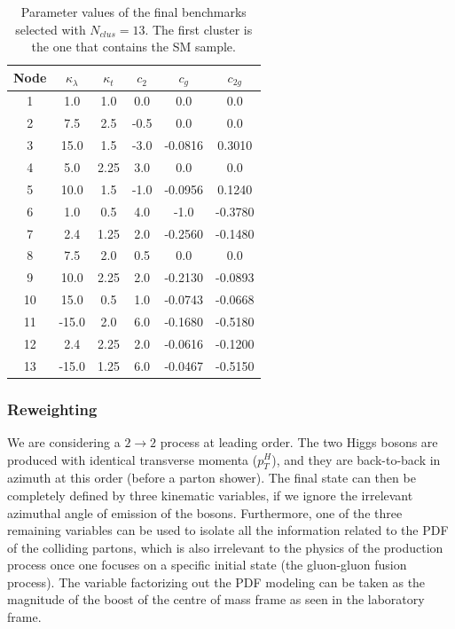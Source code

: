 \begin{table}
\centering
\small{
\begin{tabular}{|c||c|c|c|c|c|}
\hline
Node & $\kappa_{\lambda}$ & $\kappa_{t}$ & $c_2$ & $c_g$ & $c_{2g}$ \\\hline
1  &   1.0 & 1.0  &  0.0 &  0.0 &  0.0  \\ \hline
2  &   7.5 & 2.5  & -0.5 &  0.0    &  0.0      \\ \hline
3  &  15.0 & 1.5  & -3.0 & -0.0816 &  0.3010   \\\hline
4  &   5.0 & 2.25 &  3.0 &  0.0    &  0.0     \\\hline
5  &  10.0 & 1.5  & -1.0 & -0.0956 &  0.1240  \\ \hline
6  &   1.0 & 0.5  &  4.0 & -1.0    & -0.3780  \\ \hline
7  &   2.4 & 1.25 &  2.0 & -0.2560 & -0.1480  \\ \hline
8  &   7.5 & 2.0  &  0.5 &  0.0    &  0.0     \\ \hline
9  &  10.0 & 2.25 &  2.0 & -0.2130 & -0.0893  \\ \hline
10 &  15.0 & 0.5  &  1.0 & -0.0743 & -0.0668  \\ \hline
11 & -15.0 & 2.0  &  6.0 & -0.1680 & -0.5180  \\ \hline
12 &   2.4 & 2.25 &  2.0 & -0.0616 & -0.1200   \\ \hline
13 & -15.0 & 1.25 &  6.0 & -0.0467 & -0.5150   \\ \hline
\end{tabular}
}
\caption{\small Parameter values of the final benchmarks selected with $N_{clus} = 13$. 
The first cluster is the one that contains the SM sample. 
\label{tab:bench_old}}
\end{table} 

\subsubsection{Reweighting}
\label{sec:rewei}

We are considering a $2\to 2$ process at leading order. The two Higgs bosons are produced with identical transverse momenta ($p_{T}^{H}$), and they are back-to-back in azimuth at this order (before a parton shower). The final state can then be completely defined by three kinematic variables, if we ignore the irrelevant azimuthal angle of emission of the bosons. Furthermore, one of the three remaining variables can be used to isolate all the information related to the PDF of the colliding partons, which is also irrelevant to the physics of the production process once one focuses on a specific initial state (the gluon-gluon fusion process). The variable factorizing out the PDF modeling can be taken as the magnitude of the boost of the centre of mass frame as seen in the laboratory frame. 

